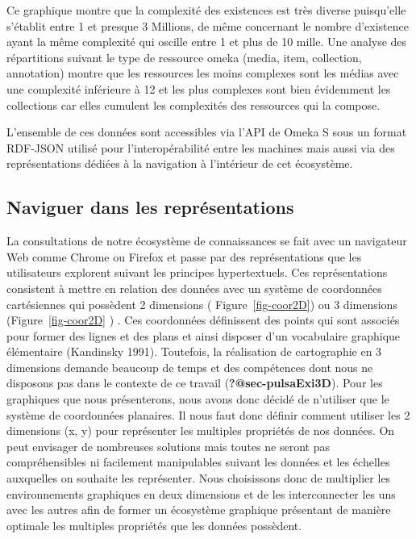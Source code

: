 \documentclass[
  letterpaper,
  DIV=11,
  numbers=noendperiod]{scrreprt}
\begin{document}
Ce graphique montre que la complexité des existences est très diverse
puisqu'elle s'établit entre 1 et presque 3 Millions, de même concernant
le nombre d'existence ayant la même complexité qui oscille entre 1 et
plus de 10 mille. Une analyse des répartitions suivant le type de
ressource omeka (media, item, collection, annotation) montre que les
ressources les moins complexes sont les médias avec une complexité
inférieure à 12 et les plus complexes sont bien évidemment les
collections car elles cumulent les complexités des ressources qui la
compose.

L'ensemble de ces données sont accessibles via l'API de Omeka S sous un
format RDF-JSON utilisé pour l'interopérabilité entre les machines mais
aussi via des représentations dédiées à la navigation à l'intérieur de
cet écosystème.

\hypertarget{sec-naviguerRepresentations}{%
\subsection{Naviguer dans les
représentations}\label{sec-naviguerRepresentations}}

La consultations de notre écosystème de connaissances se fait avec un
navigateur Web comme Chrome ou Firefox et passe par des représentations
que les utilisateurs explorent suivant les principes hypertextuels. Ces
représentations consistent à mettre en relation des données avec un
système de coordonnées cartésiennes qui possèdent 2 dimensions (
Figure~\ref{fig-coor2D}) ou 3 dimensions (Figure~\ref{fig-coor2D} ) .
Ces coordonnées définissent des points qui sont associés pour former des
lignes et des plans et ainsi disposer d'un vocabulaire graphique
élémentaire (Kandinsky 1991). Toutefois, la réalisation de cartographie
en 3 dimensions demande beaucoup de temps et des compétences dont nous
ne disposons pas dans le contexte de ce travail
(\textbf{?@sec-pulsaExi3D}). Pour les graphiques que nous présenterons,
nous avons donc décidé de n'utiliser que le système de coordonnées
planaires. Il nous faut donc définir comment utiliser les 2 dimensions
(x, y) pour représenter les multiples propriétés de nos données. On peut
envisager de nombreuses solutions mais toutes ne seront pas
compréhensibles ni facilement manipulables suivant les données et les
échelles auxquelles on souhaite les représenter. Nous choisissons donc
de multiplier les environnements graphiques en deux dimensions et de les
interconnecter les uns avec les autres afin de former un écosystème
graphique présentant de manière optimale les multiples propriétés que
les données possèdent.
\end{document}
